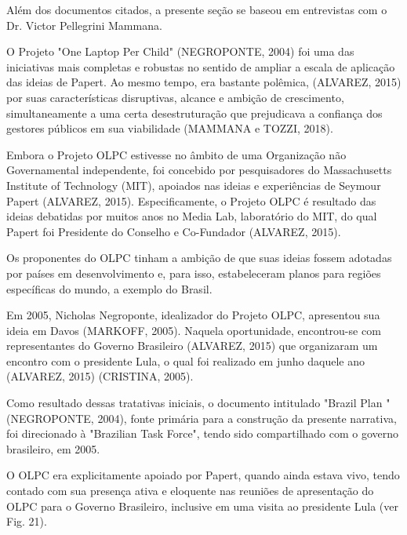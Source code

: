 Além dos documentos citados, a presente seção se baseou em entrevistas com o Dr. Victor Pellegrini Mammana.

O Projeto "One Laptop Per Child" (NEGROPONTE, 2004) foi uma das iniciativas mais completas e robustas no sentido de ampliar a escala de aplicação das ideias de Papert. Ao mesmo tempo, era bastante polêmica, (ALVAREZ, 2015) por suas características disruptivas, alcance e ambição de crescimento, simultaneamente a uma certa desestruturação que prejudicava a confiança dos gestores públicos em sua viabilidade (MAMMANA e TOZZI, 2018).

Embora o Projeto OLPC estivesse no âmbito de uma Organização não Governamental independente,  foi concebido por pesquisadores do Massachusetts Institute of Technology (MIT), apoiados nas ideias e experiências de Seymour Papert (ALVAREZ, 2015). Especificamente, o Projeto OLPC é resultado das ideias debatidas por muitos anos no Media Lab, laboratório do MIT, do qual Papert foi Presidente do Conselho e Co-Fundador (ALVAREZ, 2015).

Os proponentes do OLPC tinham a ambição de que suas ideias fossem adotadas por países em desenvolvimento e, para isso, estabeleceram planos para regiões específicas do mundo, a exemplo do Brasil.

Em 2005, Nicholas Negroponte, idealizador do Projeto OLPC, apresentou sua ideia em Davos (MARKOFF, 2005). Naquela oportunidade, encontrou-se com representantes do Governo Brasileiro (ALVAREZ, 2015) que organizaram um encontro com o presidente Lula, o qual foi realizado em junho daquele ano (ALVAREZ, 2015) (CRISTINA, 2005).

Como resultado dessas tratativas iniciais, o documento intitulado "Brazil Plan " (NEGROPONTE, 2004), fonte primária para a construção da presente narrativa, foi direcionado à "Brazilian Task Force", tendo sido compartilhado com o governo brasileiro, em 2005.

O OLPC era explicitamente apoiado por Papert, quando ainda estava vivo, tendo contado com sua presença ativa e eloquente nas reuniões de apresentação do OLPC para o Governo Brasileiro, inclusive em uma visita ao presidente Lula (ver Fig. 21).



